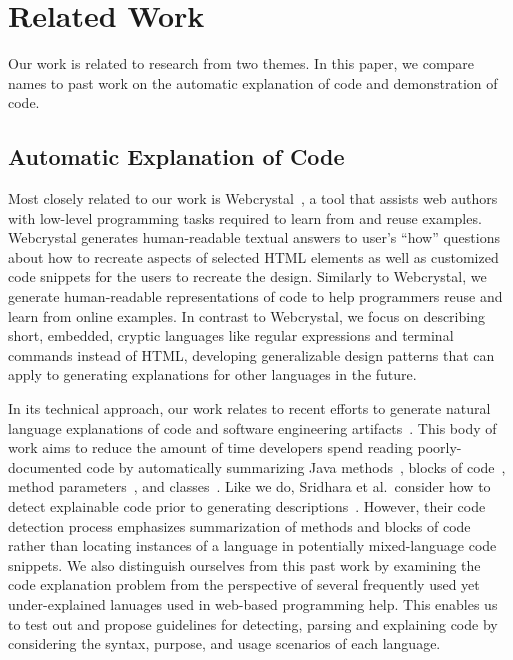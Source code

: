 \section{Related Work}

Our work is related to research from two themes.
In this paper, we compare \Glspl{name} to past work on the automatic explanation of code and demonstration of code.

\subsection{Automatic Explanation of Code}

Most closely related to our work is Webcrystal~\cite{chang_webcrystal_2012}, a tool that assists web authors with low-level programming tasks required to learn from and reuse examples.  
Webcrystal generates human-readable textual answers to user's ``how'' questions about how to recreate aspects of selected HTML elements as well as customized code snippets for the users to recreate the design.
Similarly to Webcrystal, we generate human-readable representations of code to help programmers reuse and learn from online examples.
In contrast to Webcrystal, we focus on describing short, embedded, cryptic languages like regular expressions and terminal commands instead of HTML, developing generalizable design patterns that can apply to generating explanations for other languages in the future.

In its technical approach, our work relates to recent efforts to generate natural language explanations of code and software engineering artifacts~\cite{sridhara_automatically_2011,burden_natural_2011,sridhara_towards_2010,kamimura_towards_2013,mcburney_automatic_2014,sridhara_generating_2011,haiduc_supporting_2010,moreno_automatic_2013}.
This body of work aims to reduce the amount of time developers spend reading poorly-documented code by automatically summarizing Java methods~\cite{sridhara_towards_2010}, blocks of code~\cite{sridhara_automatically_2011}, method parameters~\cite{sridhara_generating_2011}, and classes~\cite{moreno_automatic_2013}.
Like we do, Sridhara et al.\ consider how to detect explainable code prior to generating descriptions~\cite{sridhara_automatically_2011,sridhara_towards_2010}.
However, their code detection process emphasizes summarization of methods and blocks of code rather than locating instances of a language in potentially mixed-language code snippets.
We also distinguish ourselves from this past work by examining the code explanation problem from the perspective of several frequently used yet under-explained lanuages used in web-based programming help.
This enables us to test out and propose guidelines for detecting, parsing and explaining code by considering the syntax, purpose, and usage scenarios of each language.

